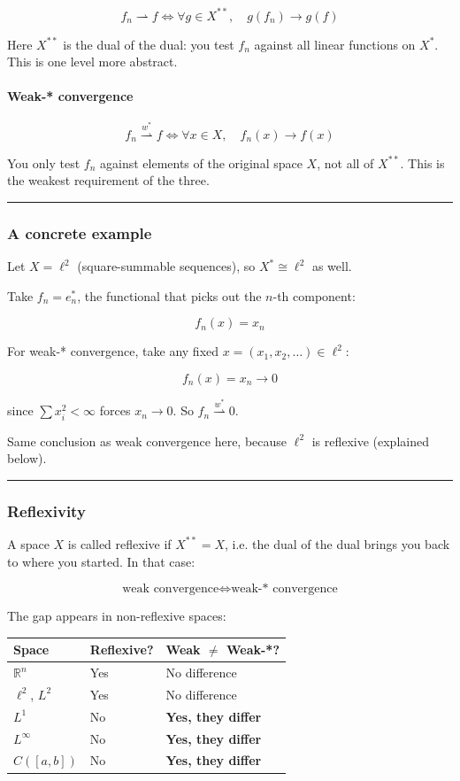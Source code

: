 \[
f_n \rightharpoonup f \iff \forall g \in X^{**}, \quad g(f_n) \to g(f)
\]

Here \(X^{**}\) is the dual of the dual: you test \(f_n\) against all linear functions on \(X^*\). This is one level more abstract.

\paragraph{Weak-* convergence}

\[
f_n \overset{w^*}{\rightharpoonup} f \iff \forall x \in X, \quad f_n(x) \to f(x)
\]

You only test \(f_n\) against elements of the original space \(X\), not all of \(X^{**}\). This is the weakest requirement of the three.

\hrule

\subsubsection{A concrete example}

Let \(X = \ell^2\) (square-summable sequences), so \(X^* \cong \ell^2\) as well.

Take \(f_n = e_n^*\), the functional that picks out the \(n\)-th component:

\[
f_n(x) = x_n
\]

For weak-* convergence, take any fixed \(x = (x_1, x_2, \ldots) \in \ell^2\):

\[
f_n(x) = x_n \to 0
\]

since \(\sum x_i^2 < \infty\) forces \(x_n \to 0\). So \(f_n \overset{w^*}{\rightharpoonup} 0\).

Same conclusion as weak convergence here, because \(\ell^2\) is reflexive (explained below).

\hrule

\subsubsection{Reflexivity}

A space \(X\) is called reflexive if \(X^{**} = X\), i.e. the dual of the dual brings you back to where you started. In that case:

\[
\text{weak convergence} \iff \text{weak-* convergence}
\]

The gap appears in non-reflexive spaces:

\begin{center}
\begin{tabular}{lll}
\toprule
Space & Reflexive? & Weak \(\neq\) Weak-*? \\
\midrule
\(\mathbb{R}^n\) & Yes & No difference \\
\(\ell^2\), \(L^2\) & Yes & No difference \\
\(L^1\) & No & \textbf{Yes, they differ} \\
\(L^\infty\) & No & \textbf{Yes, they differ} \\
\(C([a,b])\) & No & \textbf{Yes, they differ} \\
\bottomrule
\end{tabular}
\end{center}

